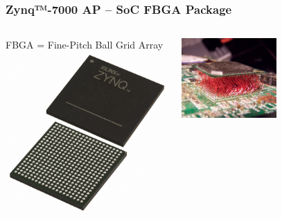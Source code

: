 \documentclass{beamer}
\begin{document}
\begin{frame}
\frametitle{Zynq™-7000 AP -- SoC FBGA Package}

\begin{columns}
\begin{column}{0.5\textwidth}
  \begin{center}
    FBGA = Fine-Pitch Ball Grid Array
    \includegraphics[width=1.0\textwidth]{fig/zynq-fbga-package.jpg}
  \end{center}
  \vfil
\end{column}
\begin{column}{0.5\textwidth}
  \begin{center}
    \includegraphics[width=0.55\textwidth]{fig/bga-soldering-clumsy.jpg}
    \newline

\end{center}
\end{column}
\end{columns}
\end{frame}
\end{document}
